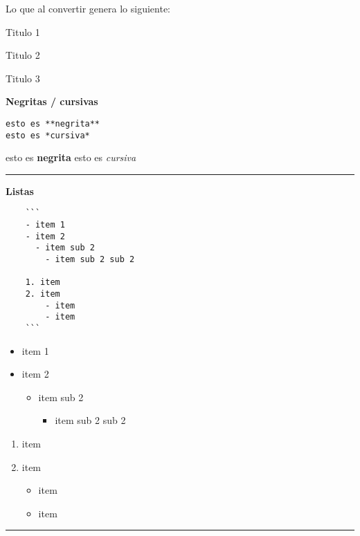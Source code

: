 \documentclass[
  11pt,
]{book}
\providecommand{\tightlist}{%
  \setlength{\itemsep}{0pt}\setlength{\parskip}{0pt}}
\begin{document}
Lo que al convertir genera lo siguiente:

Titulo 1

Titulo 2

Titulo 3

\textbf{Negritas / cursivas}

\begin{verbatim}
esto es **negrita**
esto es *cursiva*
\end{verbatim}

esto es \textbf{negrita}
esto es \emph{cursiva}

\begin{center}\rule{0.5\linewidth}{0.5pt}\end{center}

\textbf{Listas}

\begin{verbatim}
    ```
    - item 1
    - item 2
      - item sub 2
        - item sub 2 sub 2

    1. item
    2. item
        - item
        - item
    ```
\end{verbatim}

\begin{itemize}
\tightlist
\item
  item 1
\item
  item 2

  \begin{itemize}
  \tightlist
  \item
    item sub 2

    \begin{itemize}
    \tightlist
    \item
      item sub 2 sub 2
    \end{itemize}
  \end{itemize}
\end{itemize}

\begin{enumerate}
\def\labelenumi{\arabic{enumi}.}
\tightlist
\item
  item
\item
  item

  \begin{itemize}
  \tightlist
  \item
    item
  \item
    item
  \end{itemize}
\end{enumerate}

\begin{center}\rule{0.5\linewidth}{0.5pt}\end{center}
\end{document}
